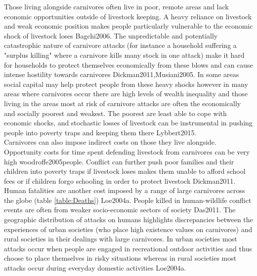 Those living alongside carnivores often live in poor, remote areas and lack economic opportunities outside of livestock keeping. A heavy reliance on livestock and weak economic position makes people particularly vulnerable to the economic shock of livestock loses {Bagchi2006}. The unpredictable and potentially catastrophic nature of carnivore attacks (for instance a household suffering a "surplus killing" where a carnivore kills many stock in one attack) make it hard for households to protect themselves economically from these blows and can cause intense hostility towards carnivores {Dickman2011,Musiani2005}. In some areas social capital may help protect people from these heavy shocks however in many areas where carnivores occur there are high levels of wealth inequality and those living in the areas most at risk of carnivore attacks are often the economically and socially poorest and weakest. The poorest are least able to cope with economic shocks, and stochastic losses of livestock can be instrumental in pushing people into poverty traps and keeping them there {Lybbert2015}.\\

Carnivores can also impose indirect costs on those they live alongside. Opportunity costs for time spent defending livestock from carnivores can be very high {woodroffe2005people}. Conflict can further push poor families and their children into poverty traps if livestock loses makes them unable to afford school fees or if children forgo schooling in order to protect livestock {Dickman2011}. Human fatalities are another cost imposed by a range of large carnivores across the globe (table \ref{table:Deaths}) {Loe2004a}. People killed in human-wildlife conflict events are often from weaker socio-economic sectors of society {Das2011}. The geographic distribution of attacks on humans highlights discrepancies between the experiences of urban societies (who place high existence values on carnivores) and rural societies in their dealings with large carnivores. In urban societies most attacks occur when people are engaged in recreational outdoor activities and thus choose to place themselves in risky situations whereas in rural societies most attacks occur during everyday domestic activities {Loe2004a}.\\

